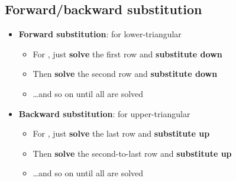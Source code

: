 \subsection*{Forward/backward
  substitution}

\begin{itemize}

  \item
        \textbf{Forward substitution}: for lower-triangular

        \begin{itemize}

          \item
                For , just \textbf{solve} the first row
                and \textbf{substitute down}
          \item
                Then \textbf{solve} the second row
                and \textbf{substitute down}
          \item
                \ldots and so on until all  are solved
        \end{itemize}
  \item
        \textbf{Backward substitution}: for upper-triangular

        \begin{itemize}

          \item
                For , just \textbf{solve} the last row
                and \textbf{substitute up}
          \item
                Then \textbf{solve} the second-to-last row
                and \textbf{substitute up}
          \item
                \ldots and so on until all  are solved
        \end{itemize}
\end{itemize}
